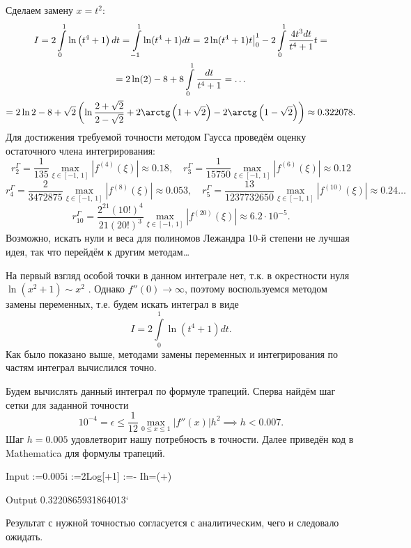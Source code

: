 \documentclass[a4paper]{article}
\begin{document}
\begin{sol}
Сделаем замену $x=t^2$:
\begin{multline*}
	I=2\int\limits_{0}^{1}  \ln\left( t^4+1 \right) dt=
	\int\limits_{-1}^{1} \ln(t^4+1)dt=
	\left. 2 \ln (t^4+1)t
 \right|_0^1-2 \int\limits_{0}^{1} \frac{4t^3dt}{t^4+1}t=\\=
 2 \ln (2)-8+8 \int\limits_{0}^{1} \frac{dt}{t^4+1}=\ldots
 \\ =
2\ln 2 - 8+\sqrt{2} \left( \ln \frac{2+\sqrt{2} }{2-\sqrt{2} }+
2 \arctg \left(1+\sqrt{2} \right)-2 \arctg\left(1-\sqrt{2}\right) \right)\approx 0.322078 .\end{multline*} 
Для достижения требуемой точности методом
Гаусса проведём оценку
остаточного члена интегрирования:
\[
	r_2^{\Gamma}= \frac{1}{135}\max_{\xi \in [-1,\,1]} \left|f^{(4)}(\xi)\right|\approx 0.18,\quad
	r_3^{\Gamma}= \frac{1}{15750}\max_{\xi \in [-1,\,1]} \left|f^{(6)}(\xi)\right|\approx 0.12
\] 
\[
	r_4^{\Gamma}= \frac{2}{3472875}\max_{\xi \in [-1,\,1]} \left|f^{(8)}(\xi)\right|\approx 0.053,\quad
	r_5^{\Gamma}= \frac{13}{1237732650}\max_{\xi \in [-1,\,1]} \left|f^{(10)}(\xi)\right|\approx 0.24\ldots
\] 
\[
	r_{10}^\Gamma= \frac{2^{21}(10!)^4}{21(20!)^3}\max_{\xi \in [-1,\,1]} \left|f^{(20)}(\xi)\right|\approx 6.2 \cdot 10^{-5}
.\] 
Возможно, искать нули и веса для полиномов Лежандра 10-й
степени не лучшая идея, так что перейдём к другим методам\ldots

На первый взгляд особой точки в данном интеграле нет, т.\:к. в окрестности нуля $\ln\left( x^2+1 \right) \sim x^2$ .
Однако $f''(0)\to \infty$, поэтому воспользуемся методом замены
переменных, т.\:е. будем искать интеграл в виде
\[
	I=2 \int\limits_{0}^{1} \ln(t^4+1)dt 
.\] Как было показано выше, методами замены переменных
и интегрирования по частям интеграл вычислился точно.

Будем вычислять данный интеграл по формуле трапеций.
Сперва найдём шаг сетки для заданной точности
\[
	10^{-4}=\epsilon \le \frac{1}{12} \max_{0\le x\le 1} |f''(x)|h^2\implies h<0.007
.\] 
Шаг $h=0.005$ удовлетворит нашу потребность в точности.
Далее приведён код в Mathematica для формулы трапеций. 
\begin{mmaCell}[morepattern={i_, i, k_},morefunctionlocal={k},moredefined={Ih}]{Input}
  :=0.005i
  :=2Log[+1]
  :=-
  Ih=(+)
\end{mmaCell}
\begin{mmaCell}[]{Output}
  0.3220865931864013`
\end{mmaCell}
Результат с нужной точностью согласуется с аналитическим, чего и следовало ожидать.
\end{sol}
\end{document}
